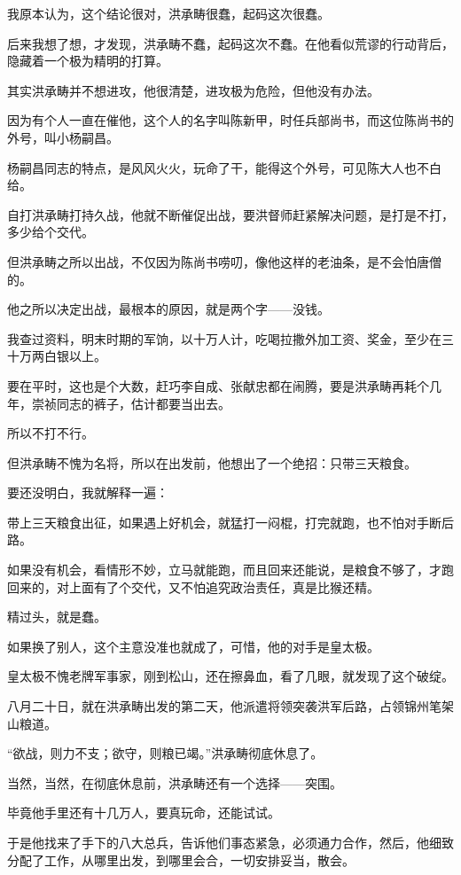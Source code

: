 \begin{multicols}{\theparacolNo}
		我原本认为，这个结论很对，洪承畴很蠢，起码这次很蠢。

		后来我想了想，才发现，洪承畴不蠢，起码这次不蠢。在他看似荒谬的行动背后，隐藏着一个极为精明的打算。

		其实洪承畴并不想进攻，他很清楚，进攻极为危险，但他没有办法。

		因为有个人一直在催他，这个人的名字叫陈新甲，时任兵部尚书，而这位陈尚书的外号，叫小杨嗣昌。

		杨嗣昌同志的特点，是风风火火，玩命了干，能得这个外号，可见陈大人也不白给。

		自打洪承畴打持久战，他就不断催促出战，要洪督师赶紧解决问题，是打是不打，多少给个交代。

		但洪承畴之所以出战，不仅因为陈尚书唠叨，像他这样的老油条，是不会怕唐僧的。

		他之所以决定出战，最根本的原因，就是两个字——没钱。

		我查过资料，明末时期的军饷，以十万人计，吃喝拉撒外加工资、奖金，至少在三十万两白银以上。

		要在平时，这也是个大数，赶巧李自成、张献忠都在闹腾，要是洪承畴再耗个几年，崇祯同志的裤子，估计都要当出去。

		所以不打不行。

		但洪承畴不愧为名将，所以在出发前，他想出了一个绝招：只带三天粮食。

		要还没明白，我就解释一遍：

		带上三天粮食出征，如果遇上好机会，就猛打一闷棍，打完就跑，也不怕对手断后路。

		如果没有机会，看情形不妙，立马就能跑，而且回来还能说，是粮食不够了，才跑回来的，对上面有了个交代，又不怕追究政治责任，真是比猴还精。

		精过头，就是蠢。

		如果换了别人，这个主意没准也就成了，可惜，他的对手是皇太极。

		皇太极不愧老牌军事家，刚到松山，还在擦鼻血，看了几眼，就发现了这个破绽。

		八月二十日，就在洪承畴出发的第二天，他派遣将领突袭洪军后路，占领锦州笔架山粮道。

		“欲战，则力不支；欲守，则粮已竭。”洪承畴彻底休息了。

		当然，当然，在彻底休息前，洪承畴还有一个选择——突围。

		毕竟他手里还有十几万人，要真玩命，还能试试。

		于是他找来了手下的八大总兵，告诉他们事态紧急，必须通力合作，然后，他细致分配了工作，从哪里出发，到哪里会合，一切安排妥当，散会。


\end{multicols}
